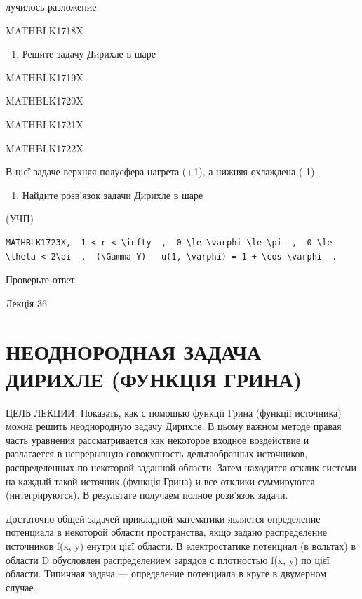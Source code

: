 \documentclass[
  ukrainian,
]{article}
\providecommand{\tightlist}{%
  \setlength{\itemsep}{0pt}\setlength{\parskip}{0pt}}
\begin{document}
лучилось разложение

MATHBLK1718X

\begin{enumerate}
\def\labelenumi{\arabic{enumi}.}
\setcounter{enumi}{4}
\tightlist
\item
  Решите задачу Дирихле в шаре
\end{enumerate}

MATHBLK1719X

MATHBLK1720X

MATHBLK1721X

MATHBLK1722X

В цієї задаче верхняя полусфера нагрета (+1), а нижняя охлаждена (-1).

\begin{enumerate}
\def\labelenumi{\arabic{enumi}.}
\setcounter{enumi}{5}
\tightlist
\item
  Найдите розв'язок задачи Дирихле в шаре
\end{enumerate}

(УЧП)

\begin{verbatim}
MATHBLK1723X,  1 < r < \infty  ,  0 \le \varphi \le \pi  ,  0 \le \theta < 2\pi  ,  (\Gamma Y)   u(1, \varphi) = 1 + \cos \varphi  .
\end{verbatim}

Проверьте ответ.

Лекція 36

\section{НЕОДНОРОДНАЯ ЗАДАЧА ДИРИХЛЕ (ФУНКЦІЯ
ГРИНА)}\label{ux43dux435ux43eux434ux43dux43eux440ux43eux434ux43dux430ux44f-ux437ux430ux434ux430ux447ux430-ux434ux438ux440ux438ux445ux43bux435-ux444ux443ux43dux43aux446ux456ux44f-ux433ux440ux438ux43dux430}

ЦЕЛЬ ЛЕКЦИИ: Показать, как с помощью функції Грина (функції источника)
можна решить неоднородную задачу Дирихле. В цьому важном методе правая
часть уравнения рассматривается как некоторое входное воздействие и
разлагается в непрерывную совокупность дельтаобразных источников,
распределенных по некоторой заданной области. Затем находится отклик
системи на каждый такой источник (функція Грина) и все отклики
суммируются (интегрируются). В результате получаем полное розв'язок
задачи.

Достаточно общей задачей прикладной математики является определение
потенциала в некоторой области пространства, якщо задано распределение
источников f(x, y) енутри цієї области. В электростатике потенциал (в
вольтах) в области D обусловлен распределением зарядов с плотностью f(x,
y) по цієї области. Типичная задача --- определение потенциала в круге в
двумерном случае.
\end{document}
